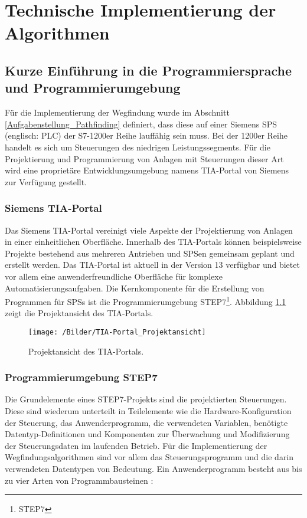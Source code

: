 \chapter{Technische Implementierung der Algorithmen}
	\label{Implementierung}
	\section{Kurze Einführung in die Programmiersprache und Programmierumgebung}
	
		Für die Implementierung der Wegfindung wurde im Abschnitt \ref{Aufgabenstellung_Pathfinding} definiert, dass diese auf einer Siemens \ac{SPS} (englisch: \acl{PLC})  der S7-1200er Reihe lauffähig sein muss. Bei der 1200er Reihe handelt es sich um  Steuerungen des niedrigen Leistungssegments. Für die Projektierung und Programmierung von Anlagen mit Steuerungen dieser Art wird eine proprietäre Entwicklungsumgebung namens \ac{TIA-Portal} von Siemens zur Verfügung gestellt.
		
		\subsection{Siemens TIA-Portal}
		
			Das Siemens \ac{TIA-Portal} vereinigt viele Aspekte der Projektierung von Anlagen in einer einheitlichen Oberfläche. Innerhalb des \ac{TIA-Portal}s können beispielsweise Projekte bestehend aus mehreren Antrieben und \ac{SPS}en gemeinsam geplant und erstellt werden. Das  \ac{TIA-Portal} ist aktuell in der Version 13 verfügbar und bietet vor allem eine anwenderfreundliche Oberfläche für komplexe Automatisierungsaufgaben. Die Kernkomponente für die Erstellung von Programmen für \aclp{SPS} ist die Programmierumgebung \acs{STEP7}\footnote{\ac{STEP7}}. Abbildung \ref{Projektansicht} zeigt die Projektansicht des \ac{TIA-Portal}s.
			
			\begin{figure}
				\centering
				\texttt{[image: /Bilder/TIA-Portal\_Projektansicht]}
				\vspace{0.2cm}
				\caption{Projektansicht des \ac{TIA-Portal}s.}\label{Projektansicht}
			\end{figure}
			
		
		\subsection{Programmierumgebung STEP7}
			Die Grundelemente eines \ac{STEP7}-Projekts sind die projektierten Steuerungen. Diese sind wiederum unterteilt in Teilelemente wie die Hardware-Konfiguration der Steuerung, das Anwenderprogramm, die verwendeten Variablen, benötigte Datentyp-Definitionen und Komponenten zur Überwachung und Modifizierung der Steuerungsdaten im laufenden Betrieb. Für die Implementierung der Wegfindungsalgorithmen sind vor allem das Steuerungsprogramm und die darin verwendeten Datentypen von Bedeutung. Ein Anwenderprogramm besteht aus bis zu vier Arten von Programmbausteinen \cite{STEP7Prog}:\\
					
